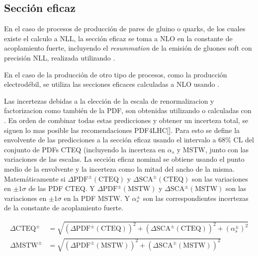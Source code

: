 \subsection{Sección eficaz}

En el caso de procesos de producción de pares de gluino o quarks, de los cuales
existe el calculo a NLL, la sección eficaz se toma a NLO en la constante de acoplamiento
fuerte, incluyendo el \emph{resummation} de la emisión de gluones soft con precisión NLL,
realizada utilizando {\nllfast}.

En el caso de la producción de otro tipo de procesos, como la producción electrodébil, se utiliza
las secciones eficaces calculadas a NLO usando {\prospino}.



\newcommand{\pdfcteqpm}{\ensuremath{\Delta\mathrm{PDF}^{\pm}(\mathrm{CTEQ})}}
\newcommand{\scacteqpm}{\ensuremath{\Delta\mathrm{SCA}^{\pm}(\mathrm{CTEQ})}}

\newcommand{\pdfmstwpm}{\ensuremath{\Delta\mathrm{PDF}^{\pm}(\mathrm{MSTW})}}
\newcommand{\scamstwpm}{\ensuremath{\Delta\mathrm{SCA}^{\pm}(\mathrm{MSTW})}}

\newcommand{\alphap}{\ensuremath{\alpha_s_+}}
\newcommand{\alpham}{\ensuremath{\alpha_s^-}}
\newcommand{\alphapm}{\ensuremath{\alpha_s^{\pm}}}


Las incertezas debidas a la elección de la escala de renormalizacion y
factorizacion como también de la PDF, son obtenidas utilizando {\nllfast} o
calculadas con {\prospino}. En orden de combinar todas estas predicciones y
obtener un incerteza total, se siguen lo mas posible las recomendaciones
PDF4LHC[]. Para esto se define la envolvente de las predicciones a la sección eficaz
usando el intervalo a 68\% CL del conjunto de PDFs CTEQ (incluyendo la incerteza en $\alpha_s$ y MSTW,
junto con las variaciones de las escalas. La sección eficaz nominal se obtiene usando el punto medio
de la envolvente y la incerteza como la mitad del ancho de la misma. Matemáticamente
si {\pdfcteqpm} y {\scacteqpm} son las variaciones en $\pm 1\sigma$ de las PDF CTEQ.
Y {\pdfmstwpm} y {\scamstwpm} son las variaciones en $\pm 1\sigma$ en la PDF MSTW.
Y {\alphapm} son las correspondientes incertezas de la constante de acoplamiento fuerte.


\begin{align}
  \Delta\mathrm{CTEQ}^{\pm} &= \sqrt{(\pdfcteqpm)^2 + (\scacteqpm)^2 + (\alphapm)^2} \\
  \Delta\mathrm{MSTW}^{\pm} &= \sqrt{(\pdfmstwpm)^2 + (\scamstwpm)^2}
\end{align}

